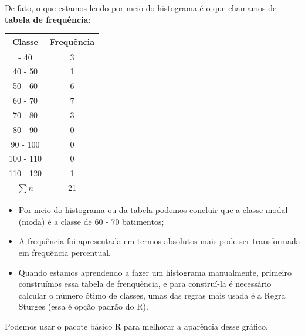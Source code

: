 \documentclass[
]{book}
\newenvironment{Shaded}{\begin{snugshade}}{\end{snugshade}}
\newcommand{\CommentTok}[1]{\textcolor[rgb]{0.56,0.35,0.01}{\textit{#1}}}
\newcommand{\FunctionTok}[1]{\textcolor[rgb]{0.13,0.29,0.53}{\textbf{#1}}}
\newcommand{\NormalTok}[1]{#1}
\newcommand{\SpecialCharTok}[1]{\textcolor[rgb]{0.81,0.36,0.00}{\textbf{#1}}}
\begin{document}
\begin{Shaded}
\end{Shaded}

De fato, o que estamos lendo por meio do histograma é o que chamamos de \textbf{tabela de frequência}:

\begin{longtable}[]{@{}cc@{}}
\toprule\noalign{}
Classe & Frequência \\
\midrule\noalign{}
\endhead
\bottomrule\noalign{}
\endlastfoot
30 - 40 & 3 \\
40 - 50 & 1 \\
50 - 60 & 6 \\
60 - 70 & 7 \\
70 - 80 & 3 \\
80 - 90 & 0 \\
90 - 100 & 0 \\
100 - 110 & 0 \\
110 - 120 & 1 \\
\(\sum n\) & 21 \\
\end{longtable}

\begin{itemize}
\item
  Por meio do histograma ou da tabela podemos concluir que a classe modal (moda) é a classe de 60 - 70 batimentos;
\item
  A frequência foi apresentada em termos absolutos mais pode ser transformada em frequência percentual.
\item
  Quando estamos aprendendo a fazer um histograma manualmente, primeiro construímos essa tabela de frenquência, e para construí-la é necessário calcular o número ótimo de classes, umas das regras mais usada é a Regra Sturges (essa é opção padrão do R).
\end{itemize}

Podemos usar o pacote básico R para melhorar a aparência desse gráfico.
\end{document}
